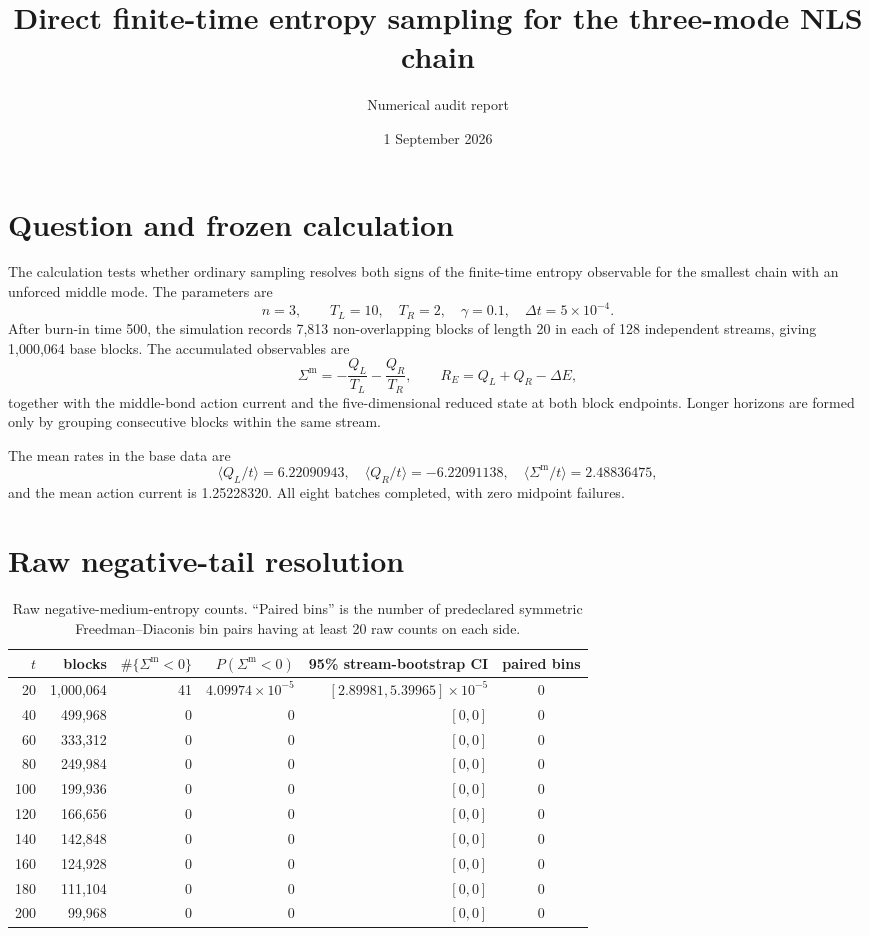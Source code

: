 \documentclass[11pt]{article}
\title{Direct finite-time entropy sampling for the three-mode NLS chain}
\author{Numerical audit report}
\date{1 September 2026}
\newcommand{\Sm}{\Sigma^{\mathrm m}}
\begin{document}
\maketitle

\section{Question and frozen calculation}

The calculation tests whether ordinary sampling resolves both signs of the
finite-time entropy observable for the smallest chain with an unforced middle
mode.  The parameters are
\[
n=3,\qquad T_L=10,\quad T_R=2,\quad \gamma=0.1,
\quad \Delta t=5\times10^{-4}.
\]
After burn-in time 500, the simulation records 7,813 non-overlapping blocks of
length 20 in each of 128 independent streams, giving 1,000,064 base blocks.
The accumulated observables are
\[
 \Sm=-\frac{Q_L}{T_L}-\frac{Q_R}{T_R},\qquad
 R_E=Q_L+Q_R-\Delta E,
\]
together with the middle-bond action current and the five-dimensional reduced
state at both block endpoints.  Longer horizons are formed only by grouping
consecutive blocks within the same stream.

The mean rates in the base data are
\[
 \langle Q_L/t\rangle=6.22090943,\quad
 \langle Q_R/t\rangle=-6.22091138,\quad
 \langle\Sm/t\rangle=2.48836475,
\]
and the mean action current is 1.25228320.  All eight batches completed, with
zero midpoint failures.

\section{Raw negative-tail resolution}

\begin{table}[ht]
\centering
\small
\begin{tabular}{rrrrrc}
\toprule
$t$ & blocks & $\#\{\Sm<0\}$ & $P(\Sm<0)$ & 95\% stream-bootstrap CI & paired bins \\
\midrule
20  & 1,000,064 & 41 & $4.09974\times10^{-5}$ & $[2.89981,5.39965]\times10^{-5}$ & 0 \\
40  & 499,968 & 0 & 0 & $[0,0]$ & 0 \\
60  & 333,312 & 0 & 0 & $[0,0]$ & 0 \\
80  & 249,984 & 0 & 0 & $[0,0]$ & 0 \\
100 & 199,936 & 0 & 0 & $[0,0]$ & 0 \\
120 & 166,656 & 0 & 0 & $[0,0]$ & 0 \\
140 & 142,848 & 0 & 0 & $[0,0]$ & 0 \\
160 & 124,928 & 0 & 0 & $[0,0]$ & 0 \\
180 & 111,104 & 0 & 0 & $[0,0]$ & 0 \\
200 & 99,968 & 0 & 0 & $[0,0]$ & 0 \\
\bottomrule
\end{tabular}
\caption{Raw negative-medium-entropy counts. ``Paired bins'' is the number of
predeclared symmetric Freedman--Diaconis bin pairs having at least 20 raw
counts on each side.}
\end{table}
\end{document}
